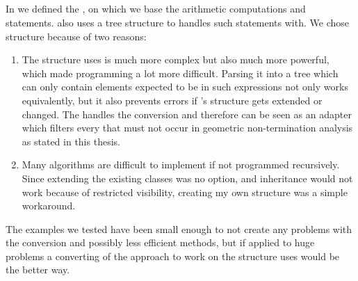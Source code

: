 \subsection{\rpntree}
In  we defined the \rpntree, on which we base the arithmetic computations and statements. \aprove also uses a tree structure to handles such statements with. We chose \rpntrees structure because of two reasons:
\begin{enumerate}
	\item The structure \aprove uses is much more complex but also much more powerful, which made programming a lot more difficult. Parsing it into a tree which can only contain elements expected to be in such expressions not only works equivalently, but it also prevents errors if \aprove's structure gets extended or changed. The  handles the conversion and therefore can be seen as an adapter which filters every \its that must not occur in geometric non-termination analysis as stated in this thesis.
	\item Many algorithms are difficult to implement if not programmed recursively. Since extending the existing classes was no option, and inheritance would not work because of restricted visibility, creating my own structure was a simple workaround.
\end{enumerate}
The examples we tested have been small enough to not create any problems with the conversion and possibly less efficient methods, but if applied to huge problems a converting of the approach to work on the structure \aprove uses would be the better way.